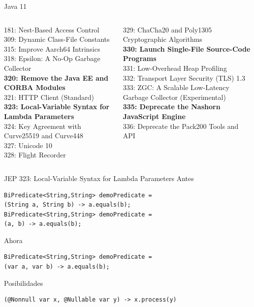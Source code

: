 \documentclass[aspectratio=169]{beamer}
\begin{document}
\begin{frame}[fragile]{Java 11}\scriptsize
\begin{columns}[T] %
    
    \begin{column}[T]{6cm} %
        181: Nest-Based Access Control\\
        309: Dynamic Class-File Constants\\
        315: Improve Aarch64 Intrinsics\\
        318: Epsilon: A No-Op Garbage Collector\\
        \textbf{320: Remove the Java EE and CORBA Modules}\\
        321: HTTP Client (Standard)\\
        \textbf{323: Local-Variable Syntax for Lambda Parameters}\\
        324: Key Agreement with Curve25519 and Curve448\\
        327: Unicode 10\\
        328: Flight Recorder\\
    \end{column}
    \begin{column}[T]{6cm} %
        329: ChaCha20 and Poly1305 Cryptographic Algorithms\\
        \textbf{330: Launch Single-File Source-Code Programs}\\
        331: Low-Overhead Heap Profiling\\
        332: Transport Layer Security (TLS) 1.3\\
        333: ZGC: A Scalable Low-Latency Garbage Collector
        (Experimental)\\
        \textbf{335: Deprecate the Nashorn JavaScript Engine}\\
        336: Deprecate the Pack200 Tools and API\\
    \end{column}
\end{columns}
\end{frame}
    

\begin{frame}[fragile]{JEP 323: Local-Variable Syntax for Lambda Parameters}
Antes
\begin{lstlisting}
BiPredicate<String,String> demoPredicate =
(String a, String b) -> a.equals(b);
BiPredicate<String,String> demoPredicate =
(a, b) -> a.equals(b);
\end{lstlisting}

Ahora
\begin{lstlisting}
BiPredicate<String,String> demoPredicate =
(var a, var b) -> a.equals(b);
\end{lstlisting}	

Posibilidades
\begin{lstlisting}
(@Nonnull var x, @Nullable var y) -> x.process(y)
\end{lstlisting}	
\end{frame}
\end{document}
